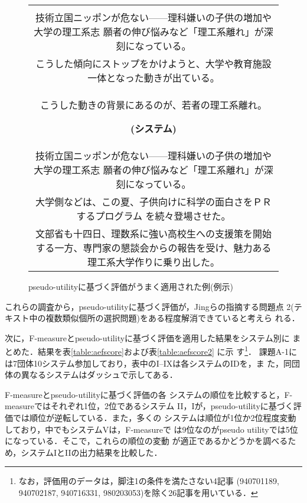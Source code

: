\begin{figure}[t]
\begin{center}
\begin{tabular}{|c|}
\begin{minipage}[c]{14cm}
{\begin{itemize}
 \item {\bf (正解)}\\
       技術立国ニッポンが危ない——理科嫌いの子供の増加や大学の理工系志
       願者の伸び悩みなど「理工系離れ」が深刻になっている。\\
       こうした傾向にストップをかけようと、大学や教育施設一体となった動きが出ている。\\
       こうした動きの背景にあるのが、若者の理工系離れ。 
 \item {\bf (システム)}\\
       技術立国ニッポンが危ない——理科嫌いの子供の増加や大学の理工系志
       願者の伸び悩みなど「理工系離れ」が深刻になっている。\\
       大学側などは、この夏、子供向けに科学の面白さをＰＲするプログラム
       を続々登場させた。\\
       文部省も十四日、理数系に強い高校生への支援策を開始する一方、専門家の懇談会からの報告を受け、魅力ある理工系大学作りに乗り出した。
\end{itemize}
\vspace{0.1cm}
}
\end{minipage}
 \\ \hline
\end{tabular}
\end{center}
\caption{pseudo-utilityに基づく評価がうまく適用された例(例示)\label{fig:ps_app2}}
\end{figure}

これらの調査から，pseudo-utilityに基づく評価が，Jingらの指摘する問題点
2(テキスト中の複数類似個所の選択問題)をある程度解消できていると考えら
れる．

次に，F-measureとpseudo-utilityに基づく評価を適用した結果をシステム別に
まとめた．結果を表\ref{table:aefscore}および表\ref{table:aefscore2} に示
す\footnote{なお，評価用のデータは，脚注1の条件を満たさない4記事
(940701189, 940702187, 940716331, 980203053)を除く26記事を用いている．}．
課題A-1には7団体10システム参加しており，表中のI--IXは各システムのIDを，ま
た，同団体の異なるシステムはダッシュで示してある．

F-measureとpseudo-utilityに基づく評価の各
システムの順位を比較すると，F-measureではそれぞれ1位，2位であるシステム
II，Iが，pseudo-utilityに基づく評価では順位が逆転している．また，多くの
システムは順位が1位か2位程度変動しており，中でもシステムVは，F-measureで
は9位なのがpseudo utilityでは5位になっている．そこで，これらの順位の変動
が適正であるかどうかを調べるため，システムIとIIの出力結果を比較した．


